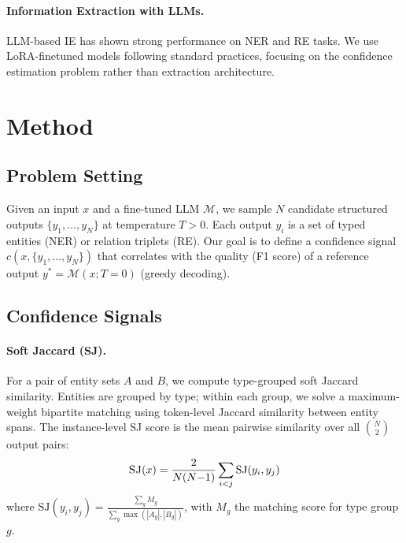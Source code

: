 \documentclass[11pt,a4paper]{article}
\newcommand{\SJ}{\textsc{SJ}}
\begin{document}
\paragraph{Information Extraction with LLMs.}
LLM-based IE has shown strong performance on NER \cite{wang2023gptner} and RE \cite{wadhwa2023revisiting} tasks.
We use LoRA-finetuned models following standard practices, focusing on the confidence estimation problem rather than extraction architecture.

\section{Method}
\label{sec:method}

\subsection{Problem Setting}

Given an input $x$ and a fine-tuned LLM $\mathcal{M}$, we sample $N$ candidate structured outputs $\{y_1, \ldots, y_N\}$ at temperature $T > 0$.
Each output $y_i$ is a set of typed entities (NER) or relation triplets (RE).
Our goal is to define a confidence signal $c(x, \{y_1, \ldots, y_N\})$ that correlates with the quality (F1 score) of a reference output $y^* = \mathcal{M}(x; T{=}0)$ (greedy decoding).

\subsection{Confidence Signals}

\paragraph{Soft Jaccard (\SJ{}).}
For a pair of entity sets $A$ and $B$, we compute type-grouped soft Jaccard similarity.
Entities are grouped by type; within each group, we solve a maximum-weight bipartite matching using token-level Jaccard similarity between entity spans.
The instance-level \SJ{} score is the mean pairwise similarity over all $\binom{N}{2}$ output pairs:
\begin{equation}
    \SJ{}(x) = \frac{2}{N(N{-}1)} \sum_{i < j} \text{SJ}(y_i, y_j)
\end{equation}
where $\text{SJ}(y_i, y_j) = \frac{\sum_g M_g}{\sum_g \max(|A_g|, |B_g|)}$, with $M_g$ the matching score for type group $g$.
\end{document}
